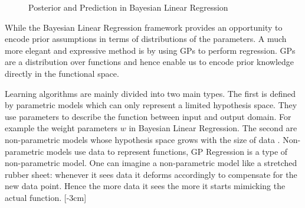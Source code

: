 \begin{figure}[!ht]
  \centering
{}\quad
{}\quad
       \caption{Posterior and Prediction in Bayesian Linear Regression}
       \label{figPriorAndPosterior}
\end{figure}

While the Bayesian Linear Regression framework provides an opportunity to encode prior assumptions in terms of distributions of the parameters. A much more elegant and expressive method is by using GPs to perform regression. GPs are a distribution over functions and hence enable us to encode prior knowledge directly in the functional space. 

Learning algorithms are mainly divided into two main types. The first is defined by parametric models which can only represent a limited hypothesis space. They use parameters to describe the function between input and output domain. For example the weight parameters $w$ in Bayesian Linear Regression. The second are non-parametric models whose hypothesis space grows with the size of data \cite{ghahramani2013bayesian}. Non-parametric models use data to represent functions, GP Regression is a type of non-parametric model. One can imagine a non-parametric model like a stretched rubber sheet: whenever it sees data it deforms accordingly to compensate for the new data point. Hence the more data it sees the more it starts mimicking the actual function. 
[-3cm]

